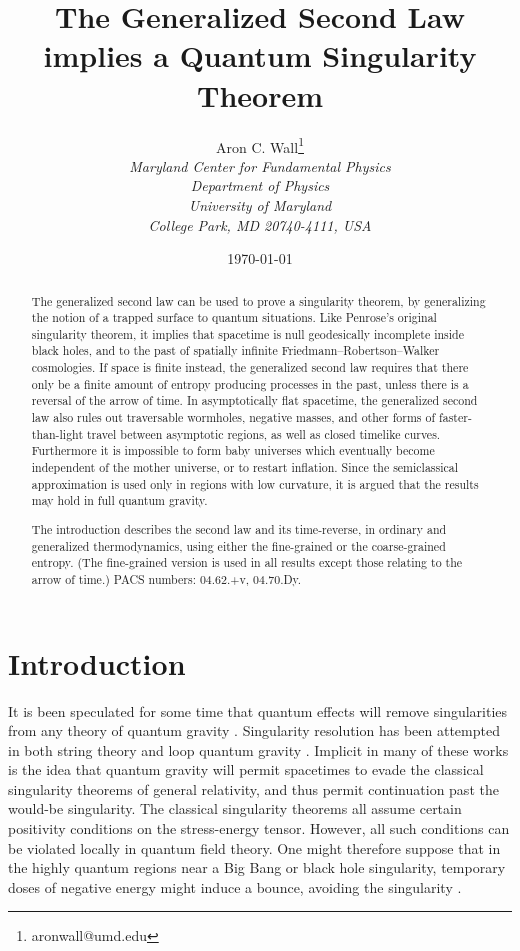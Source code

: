 \documentclass{article}
\author{Aron C. Wall\footnote{aronwall@umd.edu}
\\ \textit{Maryland Center for Fundamental Physics} \\ \textit{Department of Physics} \\ \textit{University of Maryland} \\ \textit{College Park, MD 20740-4111, USA} }
\title{The Generalized Second Law implies a Quantum Singularity Theorem}
\date{\today}
\begin{document}
\maketitle

\begin{abstract}

The generalized second law can be used to prove a singularity theorem, by generalizing the notion of a trapped surface to quantum situations.  Like Penrose's original singularity theorem, it implies that spacetime is null geodesically incomplete inside black holes, and to the past of spatially infinite Friedmann--Robertson--Walker cosmologies.  If space is finite instead, the generalized second law requires that there only be a finite amount of entropy producing processes in the past, unless there is a reversal of the arrow of time.  In asymptotically flat spacetime, the generalized second law also rules out traversable wormholes, negative masses, and other forms of faster-than-light travel between asymptotic regions, as well as closed timelike curves.  Furthermore it is impossible to form baby universes which eventually become independent of the mother universe, or to restart inflation.  Since the semiclassical approximation is used only in regions with low curvature, it is argued that the results may hold in full quantum gravity.

The introduction describes the second law and its time-reverse, in ordinary and generalized thermodynamics, using either the fine-grained or the coarse-grained entropy.  (The fine-grained version is used in all results except those relating to the arrow of time.)
\newline\newline
PACS numbers: 04.62.+v, 04.70.Dy.
\end{abstract}

\newpage

\tableofcontents

\section{Introduction}\label{intro}

It is been speculated for some time that quantum effects will remove singularities from any theory of quantum gravity \cite{SingRes}.  Singularity resolution has been attempted in both string theory \cite{stringy} and loop quantum gravity \cite{loopy}.  Implicit in many of these works is the idea that quantum gravity will permit spacetimes to evade the classical singularity theorems of general relativity, and thus permit continuation past the would-be singularity.  The classical singularity theorems all assume certain positivity conditions on the stress-energy tensor.  However, all such conditions can be violated locally in quantum field theory.  One might therefore suppose that in the highly quantum regions near a Big Bang or black hole singularity, temporary doses of negative energy might induce a bounce, avoiding the singularity \cite{bounce}.
\end{document}
